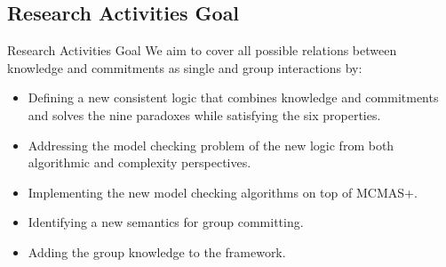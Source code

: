 \documentclass{beamer}
\begin{document}
\subsection{Research Activities Goal}
    \begin{frame}{Research Activities Goal}
    We aim to cover all possible relations between knowledge and commitments as single and group interactions by:

        \begin{itemize}
              \item Defining a new consistent logic that combines knowledge and commitments and solves the nine paradoxes while satisfying the six properties.
              \item Addressing the model checking problem of the new logic from both algorithmic and complexity perspectives.
              \item Implementing the new model checking algorithms on top of MCMAS+.
              \item Identifying a new semantics for group committing.
              \item Adding the group knowledge to the framework.
        \end{itemize}


\end{frame}

\end{document}
